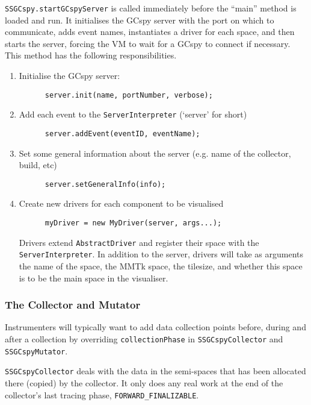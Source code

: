 \texttt{SSGCspy.startGCspyServer} is called immediately before the ``main'' method is loaded and run. 
It initialises the GCspy server with the port on which to communicate,
adds event names, 
instantiates a driver for each space, and then starts the server,
forcing the VM to wait for a GCspy to connect if necessary.
This method has the following responsibilities.

\begin{enumerate}
\item Initialise the GCspy server: 
\begin{verbatim}
      server.init(name, portNumber, verbose);
\end{verbatim}

\item Add each event to the \texttt{ServerInterpreter} (`server' for short) 
\begin{verbatim}
      server.addEvent(eventID, eventName);
\end{verbatim}

\item Set some general information about the server 
      (e.g. name of the collector, build, etc) 
\begin{verbatim}
      server.setGeneralInfo(info);
\end{verbatim}

\item Create new drivers for each component to be visualised 
\begin{verbatim}
      myDriver = new MyDriver(server, args...);
\end{verbatim}
      Drivers extend \texttt{AbstractDriver} and register their space with the 
      \texttt{ServerInterpreter}. In addition to the server, drivers will take 
      as arguments the name of the space, the MMTk space, the tilesize, and
      whether this space is to be the main space in the visualiser.
\end{enumerate}

\subsubsection{The Collector and Mutator}

Instrumenters  will typically want to add data collection points 
before, during and after a collection by overriding \texttt{collectionPhase} 
in \texttt{SSGCspyCollector} and \texttt{SSGCspyMutator}.

\texttt{SSGCspyCollector} deals with the data in the semi-spaces
that has been allocated there (copied) by the collector. It only
does any real work at the end of the collector's last tracing
phase, \texttt{FORWARD\_FINALIZABLE}.

